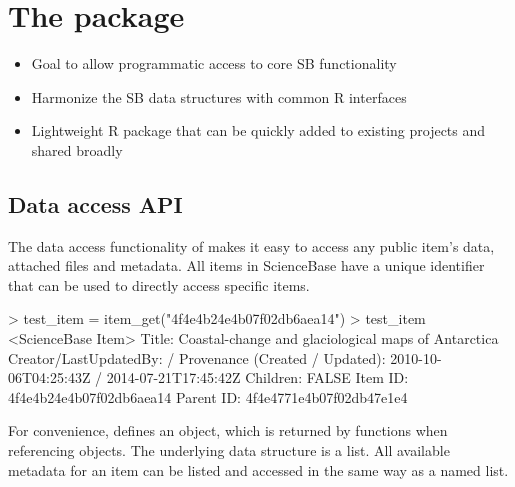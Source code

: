 
\section{The  package}
\begin{itemize}
	\item{Goal to allow programmatic access to core SB functionality}
	\item{Harmonize the SB data structures with common R interfaces}
	\item{Lightweight R package that can be quickly added to existing projects and shared broadly}
\end{itemize}



\subsection{Data access API}
The data access functionality of  makes it easy to 
access any public item's data, attached files and metadata. All items
in ScienceBase have a unique identifier that can be used to directly 
access specific items. 

\begin{example}
> test_item = item_get("4f4e4b24e4b07f02db6aea14")
> test_item
<ScienceBase Item> 
  Title: Coastal-change and glaciological maps of Antarctica
  Creator/LastUpdatedBy:      / 
  Provenance (Created / Updated):  2010-10-06T04:25:43Z / 2014-07-21T17:45:42Z
  Children: FALSE
  Item ID: 4f4e4b24e4b07f02db6aea14
  Parent ID: 4f4e4771e4b07f02db47e1e4
\end{example}

For convenience,  defines an  object, which is 
returned by  functions when referencing objects. The underlying
data structure is a list. All available metadata for an item can be listed
and accessed in the same way as a named list.



